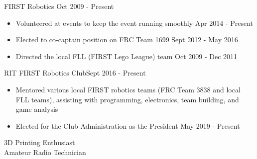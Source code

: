 \documentclass[line,margin]{res}
\begin{document}
\begin{resume}
		FIRST Robotics \hfill Oct 2009 - Present
		\begin{itemize}
			\item Volunteered at events to keep the event running smoothly \hfill Apr 2014 - Present
			\item Elected to co-captain position on FRC Team 1699 \hfill Sept 2012 - May 2016
			\item Directed the local FLL (FIRST Lego League) team \hfill Oct 2009 - Dec 2011
		\end{itemize}
		\vspace{-8pt}

		RIT FIRST Robotics Club\hfill Sept 2016 - Present
		\begin{itemize}
			\item Mentored various local FIRST robotics teams (FRC Team 3838 and local FLL teams), assisting with programming, electronics, team building, and game analysis
			\item Elected for the Club Administration as the President \hfill May 2019 - Present
		\end{itemize}

		3D Printing Enthusiast \\
		Amateur Radio Technician
\end{resume}
\end{document}
